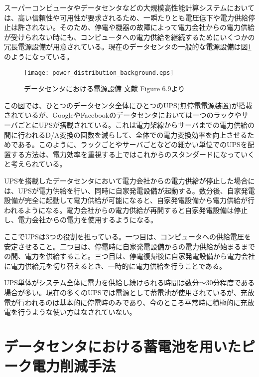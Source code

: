 スーパーコンピュータやデータセンタなどの大規模高性能計算システムにおいては、高い信頼性や可用性が要求されるため、一瞬たりとも電圧低下や電力供給停止は許されない。そのため、停電や機器の故障によって電力会社からの電力供給が受けられない時にも、コンピュータへの電力供給を継続するためにいくつかの冗長電源設備が用意されている。現在のデータセンタの一般的な電源設備は図\ref{fig:power_distribution_background}のようになっている。
\begin{figure}[t]
 \begin{center}
  \texttt{[image: power\_distribution\_background.eps]}
 \end{center}
 \caption{データセンタにおける電源設備 文献\cite{Hennessy:2011:CAF:1999263} Figure 6.9より}
 \label{fig:power_distribution_background}
\end{figure}

この図では、ひとつのデータセンタ全体にひとつのUPS(無停電電源装置)が搭載されているが、GoogleやFacebookのデータセンタにおいては一つのラックやサーバごとにUPSが搭載されている\cite{Datacenter}。これは電力架線からサーバまでの電力供給の間に行われるD/A変換の回数を減らして、全体での電力変換効率を向上させるためである。このように、ラックごとやサーバごとなどの細かい単位でのUPSを配置する方法は、電力効率を重視する上ではこれからのスタンダードになっていくと考えられている。

UPSを搭載したデータセンタにおいて電力会社からの電力供給が停止した場合には、UPSが電力供給を行い、同時に自家発電設備が起動する。数分後、自家発電設備が完全に起動して電力供給が可能になると、自家発電設備から電力供給が行われるようになる。電力会社からの電力供給が再開すると自家発電設備は停止し、電力会社からの電力を使用するようになる。

ここでUPSは3つの役割を担っている。一つ目は、コンピュータへの供給電圧を安定させること。二つ目は、停電時に自家発電設備からの電力供給が始まるまでの間、電力を供給すること。三つ目は、停電復帰後に自家発電設備から電力会社に電力供給元を切り替えるとき、一時的に電力供給を行うことである。

UPS単体がシステム全体に電力を供給し続けられる時間は数分〜30分程度である場合が多い。現在の多くのUPSでは電源として蓄電池が使用されているが、充放電が行われるのは基本的に停電時のみであり、今のところ平常時に積極的に充放電を行うような使い方はなされていない。



\section{データセンタにおける蓄電池を用いたピーク電力削減手法}
\label{sec:capping}

